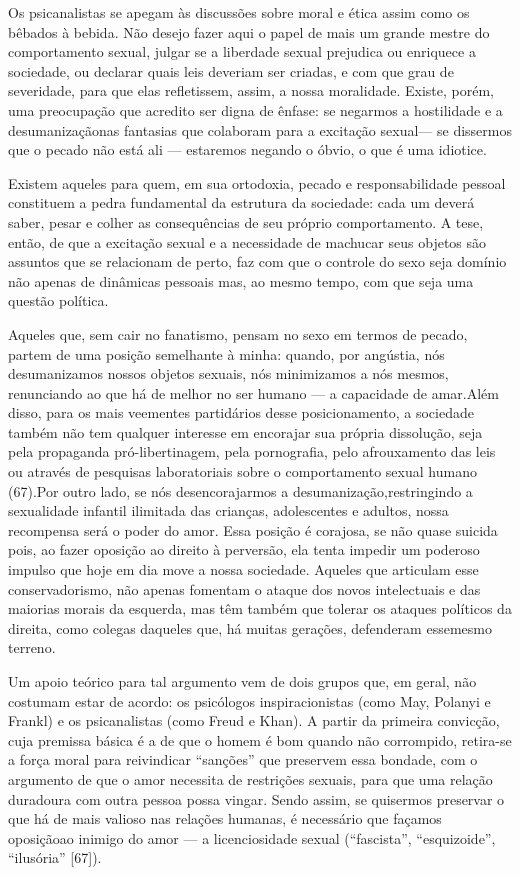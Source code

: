 Os psicanalistas se apegam às discussões sobre moral e ética assim
como os bêbados à bebida. Não desejo fazer aqui o papel de mais um
grande mestre do comportamento sexual, julgar se a liberdade sexual
prejudica ou enriquece a sociedade, ou declarar quais leis deveriam ser
criadas, e com que grau de severidade, para que elas refletissem,
assim, a nossa moralidade. Existe, porém, uma preocupação que acredito
ser digna de ênfase: se negarmos a hostilidade e a desumanização\idxdesu[|(] nas
fantasias que colaboram para a excitação sexual\idxdesuexci[|)] --- se dissermos que o
pecado não está ali --- estaremos negando o óbvio, o que é uma
idiotice.

Existem aqueles para quem, em sua ortodoxia, pecado e
responsabilidade pessoal constituem a pedra fundamental da estrutura da
sociedade: cada um deverá saber, pesar e colher as consequências de seu
próprio comportamento. A tese, então, de que a excitação sexual e a
necessidade de machucar seus objetos são assuntos que se relacionam de
perto, faz com que o controle do sexo seja domínio não apenas de
dinâmicas pessoais mas, ao mesmo tempo, com que seja uma questão
política.\idxsexue{}

Aqueles que, sem cair no fanatismo, pensam no sexo em termos de
pecado, partem de uma posição semelhante à minha: quando, por angústia,
nós desumanizamos nossos objetos sexuais, nós minimizamos a nós mesmos,
renunciando ao que há de melhor no ser humano --- a capacidade de
amar.\idxsexulres[|(] Além disso, para os mais veementes partidários desse
posicionamento, a sociedade também não tem qualquer interesse em
encorajar sua própria dissolução, seja pela propaganda
pró-libertinagem, pela pornografia, pelo afrouxamento das leis ou
através de pesquisas laboratoriais sobre o comportamento sexual humano
(67).\idxleis[|)] Por outro lado, se nós desencorajarmos a desumanização,\idxaspeccon[|(]
restringindo a sexualidade infantil ilimitada das crianças,
adolescentes e adultos, nossa recompensa será o poder do amor. Essa
posição é corajosa, se não quase suicida pois, ao fazer oposição ao
direito à perversão, ela tenta impedir um poderoso impulso que hoje em
dia move a nossa sociedade. Aqueles que articulam esse conservadorismo,
não apenas fomentam o ataque dos novos intelectuais e das maiorias
morais da esquerda, mas têm também que tolerar os ataques políticos da
direita, como colegas daqueles que, há muitas gerações, defenderam esse\idxsexuedes[|)]
mesmo terreno.\idxsexue[|)]

Um apoio teórico para tal argumento vem de dois grupos que, em
geral, não costumam estar de acordo: os psicólogos inspiracionistas
(como May,\idxmay{} Polanyi\idxpolan{} e Frankl)\idxfrank{} e os psicanalistas (como Freud\idxfreud{} e Khan).\idxkhan{} A
partir da primeira convicção, cuja premissa básica é a de que o homem é
bom quando não corrompido, retira-se a força moral para reivindicar
``sanções'' que preservem essa bondade, com o
argumento de que o amor necessita de restrições sexuais, para que uma
relação duradoura com outra pessoa possa vingar. Sendo assim, se
quisermos preservar o que há de mais valioso nas relações humanas, é
necessário que façamos oposição\idxhostexci[|)] ao inimigo do amor --- a
licenciosidade sexual (``fascista'',
``esquizoide'',
``ilusória'' [67]).

